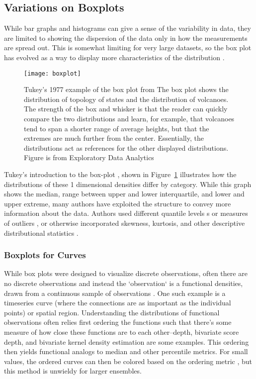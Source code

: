 \documentclass[../main.tex]{subfiles}
\begin{document}
\subsection{Variations on Boxplots}

While bar graphs and histograms can give a sense of the variability in data, they are limited to showing the dispersion of the data only in how the measurements are spread out. This is somewhat limiting for very large datasets, so the box plot has evolved as a way to display more characteristics of the distribution \cite{wickham_40_2011}. 

\begin{figure}
  \texttt{[image: boxplot]}
  \caption{Tukey's 1977 example of the box plot from
    The box plot shows the distribution of topology of states and
    the distribution of volcanoes. The strength of the box and whisker is that the
    reader can quickly compare the two distributions and learn, for example,
    that volcanoes tend to span a shorter range of average heights, but that the
    extremes are much further from the center. Essentially, the distributions act as references for the other displayed distributions. Figure is from Exploratory Data Analytics\cite{tukey_exploratory_1977} }
  \label{fig:boxplot}
\end{figure}

Tukey's introduction to the box-plot \cite{tukey_exploratory_1977}, shown in
Figure~\ref{fig:boxplot} illustrates how the distributions of these 1 dimensional densities differ by category. While this graph shows the median, range between upper and lower interquartile, and lower and upper extreme, many authors have exploited the structure to convey more information about the data. Authors used different quantile levels \cite{hyndman_sample_1996}s or measures of outliers
\cite{frigge_implementations_1989, schwertman_identifying_2007}, or otherwise incorporated skewness, kurtosis, and other descriptive distributional statistics \cite{kim_more_2004, marmolejo-ramos_shifting_2015}.

\subsubsection{Boxplots for Curves}
While box plots were designed to visualize discrete observations, often there
are no discrete observations and instead the `observation` is a functional densities, drawn from a continuous sample of observations \cite{ramsay_functional_2006, muller_functional_2006}.
One such example is a timeseries curve (where the connections are as important as the individual points) or
spatial region. Understanding the distributions of functional observations
often relies first ordering the functions such that there's some measure of how close these functions are to each other--depth\cite{febrero_functional_2007,lopez-pintado_functional_2007},
bivariate score depth\cite{rob_j._hyndman_rainbow_2010}, and
bivariate kernel density estimation\cite{scott_multivariate_1992} are some examples. This
ordering then yields functional analogs to median and other percentile
metrics. For small values, the ordered curves can then be colored based on the
ordering metric \cite{rob_j._hyndman_rainbow_2010}, but this method is unwieldy for larger
ensembles.
\end{document}
